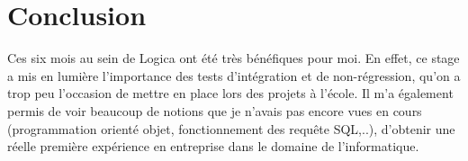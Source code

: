 \chapter*{Conclusion}

Ces six mois au sein de Logica ont été très bénéfiques pour moi. En effet, ce stage a mis en lumière l'importance des tests d'intégration et de non-régression, qu'on a trop peu l'occasion de mettre en place lors des projets à l'école. Il m'a également permis de voir beaucoup de notions que je n'avais pas encore vues en cours (programmation orienté objet, fonctionnement des requête SQL,..), d'obtenir une réelle première expérience en entreprise dans le domaine de l'informatique.
